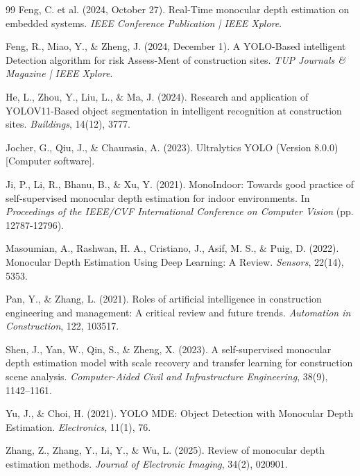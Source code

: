 \begin{thebibliography}{99}
Feng, C. et al. (2024, October 27). Real-Time monocular depth estimation on embedded systems. \textit{IEEE Conference Publication | IEEE Xplore}.

Feng, R., Miao, Y., \& Zheng, J. (2024, December 1). A YOLO-Based intelligent Detection algorithm for risk Assess-Ment of construction sites. \textit{TUP Journals \& Magazine | IEEE Xplore}.

He, L., Zhou, Y., Liu, L., \& Ma, J. (2024). Research and application of YOLOV11-Based object segmentation in intelligent recognition at construction sites. \textit{Buildings}, 14(12), 3777.

Jocher, G., Qiu, J., \& Chaurasia, A. (2023). Ultralytics YOLO (Version 8.0.0) [Computer software].

Ji, P., Li, R., Bhanu, B., \& Xu, Y. (2021). MonoIndoor: Towards good practice of self-supervised monocular depth estimation for indoor environments. In \textit{Proceedings of the IEEE/CVF International Conference on Computer Vision} (pp. 12787-12796).

Masoumian, A., Rashwan, H. A., Cristiano, J., Asif, M. S., \& Puig, D. (2022). Monocular Depth Estimation Using Deep Learning: A Review. \textit{Sensors}, 22(14), 5353.

Pan, Y., \& Zhang, L. (2021). Roles of artificial intelligence in construction engineering and management: A critical review and future trends. \textit{Automation in Construction}, 122, 103517.

Shen, J., Yan, W., Qin, S., \& Zheng, X. (2023). A self-supervised monocular depth estimation model with scale recovery and transfer learning for construction scene analysis. \textit{Computer-Aided Civil and Infrastructure Engineering}, 38(9), 1142–1161.

Yu, J., \& Choi, H. (2021). YOLO MDE: Object Detection with Monocular Depth Estimation. \textit{Electronics}, 11(1), 76.

Zhang, Z., Zhang, Y., Li, Y., \& Wu, L. (2025). Review of monocular depth estimation methods. \textit{Journal of Electronic Imaging}, 34(2), 020901.

\end{thebibliography}